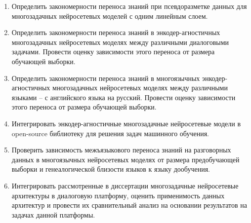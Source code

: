\begin{enumerate}
  \item {Определить закономерности переноса знаний при псевдоразметке данных для многозадачных нейросетевых моделей с одним линейным слоем.}
  \item {Определить закономерности переноса знаний в энкодер-агностичных многозадачных нейросетевых моделях между различными диалоговыми задачами. Провести оценку зависимости этого переноса от размера обучающей выборки.}
  \item {Определить закономерности переноса знаний в многоязычных энкодер-агностичных многозадачных нейросетевых моделях между различными языками -- с английского языка на русский. Провести оценку зависимости этого переноса от размера обучающей выборки.}
  \item {Интегрировать энкодер-агностичные многозадачные нейросетевые модели в open-source библиотеку для решения задач машинного обучения.} 
  \item {Проверить зависимость межъязыкового переноса знаний на разговорных данных в многоязычных нейросетевых моделях от размера предобучающей выборки и генеалогической близости языков к языку дообучения.}
  \item {Интегрировать рассмотренные в диссертации многозадачные нейросетевые архитектуры в диалоговую платформу, оценить применимость данных архитектур и провести их сравнительный анализ на основании результатов на задачах данной платформы.}%
  \newline
  \newline
\end{enumerate}


